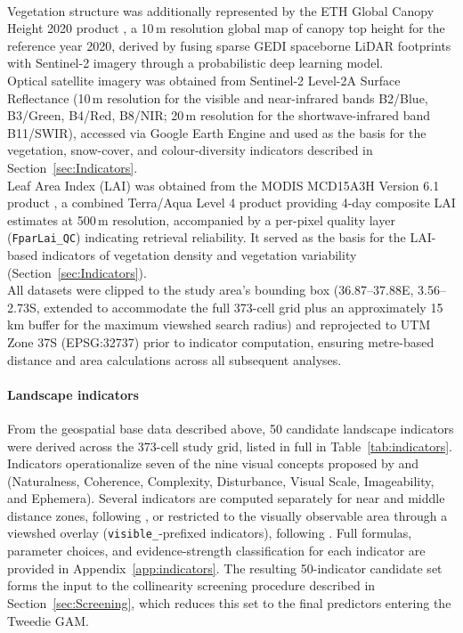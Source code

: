 \documentclass[hidelinks, 11pt]{article}
\begin{document}
\\
Vegetation structure was additionally represented by the ETH Global Canopy Height 2020 product \citep{lang_highresolution_2023}, a 10\,m resolution global map of canopy top height for the reference year 2020, derived by fusing sparse GEDI spaceborne LiDAR footprints with Sentinel-2 imagery through a probabilistic deep learning model.
\\
Optical satellite imagery was obtained from Sentinel-2 Level-2A Surface Reflectance (10\,m resolution for the visible and near-infrared bands B2/Blue, B3/Green, B4/Red, B8/NIR; 20\,m resolution for the shortwave-infrared band B11/SWIR), accessed via Google Earth Engine and used as the basis for the vegetation, snow-cover, and colour-diversity indicators described in Section~\ref{sec:Indicators}.
\\
Leaf Area Index (LAI) was obtained from the MODIS MCD15A3H Version 6.1 product \citep{myneni_mcd15a3h_2021}, a combined Terra/Aqua Level 4 product providing 4-day composite LAI estimates at 500\,m resolution, accompanied by a per-pixel quality layer (\texttt{FparLai\_QC}) indicating retrieval reliability. It served as the basis for the LAI-based indicators of vegetation density and vegetation variability (Section~\ref{sec:Indicators}).
\\
All datasets were clipped to the study area's bounding box (36.87--37.88\textdegree{}E, 3.56--2.73\textdegree{}S, extended to accommodate the full 373-cell grid plus an approximately 15\,km buffer for the maximum viewshed search radius) and reprojected to UTM Zone 37S (EPSG:32737) prior to indicator computation, ensuring metre-based distance and area calculations across all subsequent analyses.

\paragraph{Landscape indicators}

From the geospatial base data described above, 50 candidate landscape indicators were derived across the 373-cell study grid, listed in full in Table~\ref{tab:indicators}. Indicators operationalize seven of the nine visual concepts proposed by \citet{tveit_key_2006} and \citet{ode_capturing_2008} (Naturalness, Coherence, Complexity, Disturbance, Visual Scale, Imageability, and Ephemera). Several indicators are computed separately for near and middle distance zones, following \citet{schirpke_predicting_2013}, or restricted to the visually observable area through a viewshed overlay (\texttt{visible\_}-prefixed indicators), following \citet{tenerelli_spatial_2017}. Full formulas, parameter choices, and evidence-strength classification for each indicator are provided in Appendix~\ref{app:indicators}. The resulting 50-indicator candidate set forms the input to the collinearity screening procedure described in Section~\ref{sec:Screening}, which reduces this set to the final predictors entering the Tweedie GAM.
\end{document}
